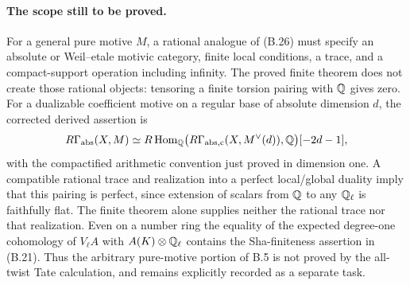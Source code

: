 \paragraph{The scope still to be proved.}
For a general pure motive \(M\), a rational analogue of (B.26)
must specify an absolute or Weil--etale motivic category, finite
local conditions, a trace, and a compact-support operation including
infinity.  The proved finite theorem does not create those rational
objects: tensoring a finite torsion pairing with \(\mathbb Q\) gives zero.
For a dualizable coefficient motive on a regular base of absolute
dimension \(d\), the corrected derived assertion is
\[
 R\Gamma_{\rm abs}(X,M)\simeq
 R\operatorname{Hom}_{\mathbb Q}
 \bigl(R\Gamma_{\rm abs,c}(X,M^\vee(d)),\mathbb Q\bigr)[-2d-1],
\]
with the compactified arithmetic convention just proved in dimension
one.  A compatible rational trace and realization into a perfect
local/global duality imply that this pairing is perfect, since
extension of scalars from \(\mathbb Q\) to any \(\mathbb Q_\ell\) is
faithfully flat.  The finite theorem alone supplies neither the
rational trace nor that realization.
Even on a number ring the equality of the expected degree-one
cohomology of \(V_\ell A\) with \(A(K)\otimes\mathbb Q_\ell\)
contains the Sha-finiteness assertion in (B.21).  Thus the arbitrary
pure-motive portion of B.5 is not proved by the all-twist Tate
calculation, and remains explicitly recorded as a separate task.

